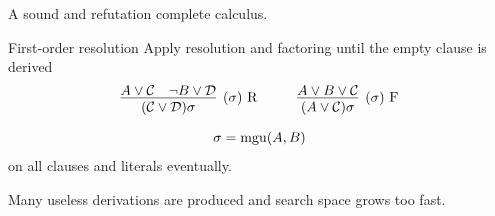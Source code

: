 
	\begin{goal}
		A sound and refutation complete calculus.
	\end{goal}
	
	\begin{block}{First-order resolution}
		Apply resolution and factoring until the empty clause is derived 
		\begin{gather*}
			\infer
			[(\sigma)\text{ R}]
			{(\mcC \lor \mcD)\sigma}
			{{A} \lor\mcC & {\lnot B} \lor\mcD}
			\hspace{1cm}
			\infer
			[(\sigma)\text{ F}]
			{(A \lor \mcC)\sigma}
			{{A}\lor B\lor\mcC} \\[0.7em]
			\sigma = \mgu(A,B)
		\end{gather*}
		on all clauses and literals eventually.
	\end{block}
	
	\begin{observation}
		Many useless derivations are produced and search space grows too fast.
	\end{observation}